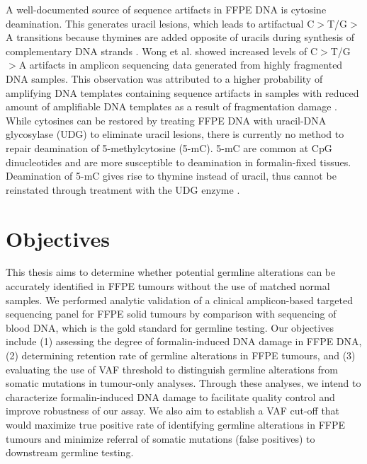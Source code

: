 A well-documented source of sequence artifacts in FFPE DNA is cytosine deamination. This generates uracil lesions, which leads to artifactual C$>$T/G$>$A transitions because thymines are added opposite of uracils during synthesis of complementary DNA strands \cite{Do2015a}. Wong et al. \cite{Wong2014} showed increased levels of C$>$T/G$>$A artifacts in amplicon sequencing data generated from highly fragmented DNA samples. This observation was attributed to a higher probability of amplifying DNA templates containing sequence artifacts in samples with reduced amount of amplifiable DNA templates as a result of fragmentation damage \cite{Wong2014}. While cytosines can be restored by treating FFPE DNA with uracil-DNA glycosylase (\acs{UDG}) to eliminate uracil lesions, there is currently no method to repair deamination of 5-methylcytosine (5-mC). 5-mC are common at CpG dinucleotides and are more susceptible to deamination in formalin-fixed tissues. Deamination of 5-mC gives rise to thymine instead of uracil, thus cannot be reinstated through treatment with the UDG enzyme \cite{Do2015a}.

\section{Objectives}
\label{sec:Objectives}

This thesis aims to determine whether potential germline alterations can be accurately identified in FFPE tumours without the use of matched normal samples. We performed analytic validation of a clinical amplicon-based targeted sequencing panel for FFPE solid tumours by comparison with sequencing of blood DNA, which is the gold standard for germline testing. Our objectives include (1) assessing the degree of formalin-induced DNA damage in FFPE DNA, (2) determining retention rate of germline alterations in FFPE tumours, and (3) evaluating the use of VAF threshold to distinguish germline alterations from somatic mutations in tumour-only analyses. Through these analyses, we intend to characterize formalin-induced DNA damage to facilitate quality control and improve robustness of our assay. We also aim to establish a VAF cut-off that would maximize true positive rate of identifying germline alterations in FFPE tumours and minimize referral of somatic mutations (false positives) to downstream germline testing.

\endinput


